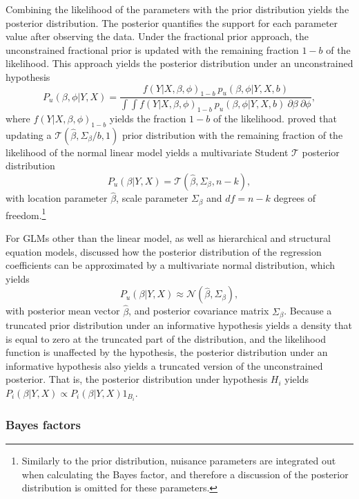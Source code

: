 \documentclass[review, 3p, authoryear]{elsarticle} %
\begin{document}
Combining the likelihood of the parameters with the prior distribution yields the posterior distribution.
The posterior quantifies the support for each parameter value after observing the data.
Under the fractional prior approach, the unconstrained fractional prior is updated with the remaining fraction \(1-b\) of the likelihood.
This approach yields the posterior distribution under an unconstrained hypothesis
\[
P_u(\beta, \phi | Y, X) = 
\frac{
f(Y | X, \beta, \phi)_{1-b} ~ p_u(\beta, \phi | Y, X, b)
}{
\int \int f(Y | X, \beta, \phi)_{1-b} ~ p_u(\beta, \phi | Y, X, b) ~ \partial \beta ~ \partial \phi
},
\]
where \(f(Y | X, \beta, \phi)_{1-b}\) yields the fraction \(1-b\) of the likelihood.
\citet{mulder_olssoncollentine_2019} proved that updating a \(\mathcal{T}(\hat{\beta}, \Sigma_\beta / b, 1)\) prior distribution with the remaining fraction of the likelihood of the normal linear model yields a multivariate Student \(\mathcal{T}\) posterior distribution
\[
P_u(\beta | Y, X) = \mathcal{T}(\hat{\beta}, \Sigma_\beta, n - k),
\]
with location parameter \(\hat{\beta}\), scale parameter \(\Sigma_{\beta}\) and \(df = n - k\) degrees of freedom.\footnote{Similarly to the prior distribution, nuisance parameters are integrated out when calculating the Bayes factor, and therefore a discussion of the posterior distribution is omitted for these parameters.}

For GLMs other than the linear model, as well as hierarchical and structural equation models, \citet{gu_approximated_2018} discussed how the posterior distribution of the regression coefficients can be approximated by a multivariate normal distribution, which yields
\[
P_u(\beta | Y, X) \approx \mathcal{N}(\hat{\beta}, \Sigma_\beta),
\]
with posterior mean vector \(\hat{\beta}\), and posterior covariance matrix \(\Sigma_\beta\).
Because a truncated prior distribution under an informative hypothesis yields a density that is equal to zero at the truncated part of the distribution, and the likelihood function is unaffected by the hypothesis, the posterior distribution under an informative hypothesis also yields a truncated version of the unconstrained posterior.
That is, the posterior distribution under hypothesis \(H_i\) yields
\(P_i(\beta | Y, X) \propto P_i(\beta | Y, X)1_{B_i}\).

\hypertarget{bayes-factors}{%
\subsubsection{Bayes factors}\label{bayes-factors}}
\end{document}
